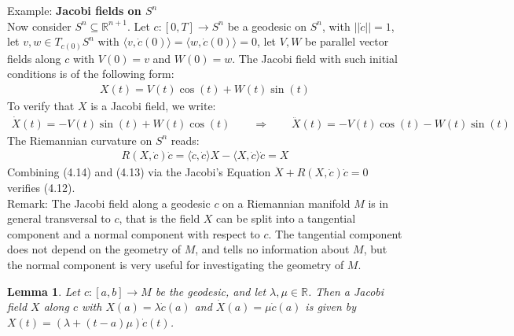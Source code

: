 \documentclass[11pt]{book}
\theoremstyle{break}
\theoremstyle{break}
\newtheorem{lem}{Lemma}[thm]
\newcommand{\R}{\mathbb{R}}
\newcommand{\remark}{\color{blue}Remark: \color{black}}
\newcommand{\example}{\color{green}Example: \color{black}}
\begin{document}
\example \textbf{Jacobi fields on $S^n$}\\
Now consider $S^n \subseteq \R^{n+1}$. Let $c:[0,T]\to S^n$ be a geodesic on $S^n$, with $||\dot{c}||  =1$, let $v,w \in T_{c(0)}S^n$ with $\langle v, \dot{c}(0)\rangle = \langle w, \dot{c}(0)\rangle =0$, let $V,W$ be parallel vector fields along $c$ with $V(0) = v$ and $W(0) = w$. The Jacobi field with such initial conditions is of the following form:
\begin{align}
X(t) = V(t) \cos(t) + W(t) \sin(t)
\end{align}
To verify that $X$ is a Jacobi field, we write:
\begin{align}
\dot{X}(t) = -V(t) \sin(t) + W(t) \cos(t) \qquad \Rightarrow \qquad \ddot{X}(t) = -V(t) \cos(t) - W(t) \sin(t)
\end{align}
The Riemannian curvature on $S^n$ reads:
\begin{align}
R(X,\dot{c})\dot{c} = \langle \dot{c},\dot{c}\rangle X - \langle X,\dot{c}\rangle \dot{c} = X 
\end{align}
Combining (4.14) and (4.13) via the Jacobi's Equation $\ddot{X}+R(X,\dot{c}) \dot{c} = 0$ verifies (4.12).\\

\remark The Jacobi field along a geodesic $c$ on a Riemannian manifold $M$ is in general transversal to $c$, that is the field $X$ can be split into a tangential component and a normal component with respect to $c$. The tangential component does not depend on the geometry of $M$, and tells no information about $M$, but the normal component is very useful for investigating the geometry of $M$.\\

\begin{lem}
Let $c:[a,b] \to M$ be the geodesic, and let $\lambda, \mu \in \R$. Then a Jacobi field $X$ along $c$ with $X(a) = \lambda \dot{c}(a)$ and $\dot{X}(a) =\mu \dot{c}(a)$ is given by $X(t) = (\lambda + (t-a) \mu ) \dot{c}(t)$. 
\end{lem}
\end{document}
